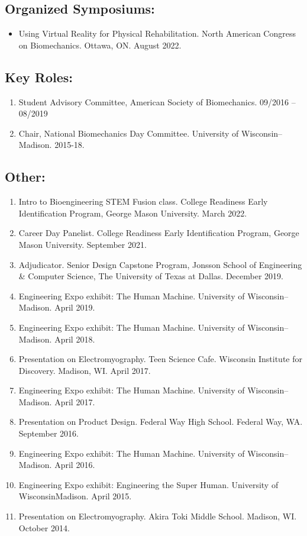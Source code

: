 \documentclass[letterpaper, 10pt]{article}
\begin{document}
\subsection{Organized Symposiums:}
\begin{itemize}
     \item Using Virtual Reality for Physical Rehabilitation. North American Congress on Biomechanics. Ottawa, ON. August 2022.
\end{itemize}


\subsection{Key Roles:}
\begin{enumerate}
    \item Student Advisory Committee, American Society of Biomechanics. 09/2016 – 08/2019
    \item Chair, National Biomechanics Day Committee. University of Wisconsin--Madison. 2015-18.
\end{enumerate}

\subsection{Other:}
\begin{enumerate}
    \item Intro to Bioengineering STEM Fusion class. College Readiness Early Identiﬁcation Program, George Mason University. March 2022.
    \item Career Day Panelist. College Readiness Early Identiﬁcation Program, George Mason University. September 2021.
    \item Adjudicator. Senior Design Capstone Program, Jonsson School of Engineering \& Computer Science, The University of Texas at Dallas. December 2019.
    \item Engineering Expo exhibit: The Human Machine. University of Wisconsin--Madison. April 2019.
    \item Engineering Expo exhibit: The Human Machine. University of Wisconsin–Madison. April 2018.
    \item Presentation on Electromyography. Teen Science Cafe. Wisconsin Institute for Discovery. Madison, WI. April 2017.
    \item Engineering Expo exhibit: The Human Machine. University of Wisconsin--Madison. April 2017.
    \item Presentation on Product Design. Federal Way High School. Federal Way, WA. September 2016.
    \item Engineering Expo exhibit: The Human Machine. University of Wisconsin--Madison. April 2016.
    \item Engineering Expo exhibit: Engineering the Super Human. University of WisconsinMadison. April 2015.
    \item Presentation on Electromyography. Akira Toki Middle School. Madison, WI. October 2014.
\end{enumerate}
\end{document}
